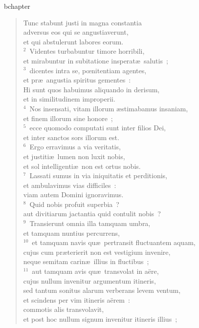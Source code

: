 bchapter\begin{flushleft}\begin{verse}\vspace{-19pt}Tunc stabunt justi in magna constantia\\ adversus eos qui se angustiaverunt,\\ et qui abstulerunt labores eorum.\\
${}^{2}$~Videntes turbabuntur timore horribili,\\ et mirabuntur in subitatione insperat\ae\ salutis~;\\
${}^{3}$~dicentes intra se, pœnitentiam agentes,\\ et pr\ae\ angustia spiritus gementes~:\\ Hi sunt quos habuimus aliquando in derisum,\\ et in similitudinem improperii.\\
${}^{4}$~Nos insensati, vitam illorum \ae stimabamus insaniam,\\ et finem illorum sine honore~;\\
${}^{5}$~ecce quomodo computati sunt inter filios Dei,\\ et inter sanctos sors illorum est.\\
${}^{6}$~Ergo erravimus a via veritatis,\\ et justiti\ae\ lumen non luxit nobis,\\ et sol intelligenti\ae\ non est ortus nobis.\\
${}^{7}$~Lassati sumus in via iniquitatis et perditionis,\\ et ambulavimus vias difficiles~:\\ viam autem Domini ignoravimus.\\
${}^{8}$~Quid nobis profuit superbia~?\\ aut divitiarum jactantia quid contulit nobis~?\\
${}^{9}$~Transierunt omnia illa tamquam umbra,\\ et tamquam nuntius percurrens,\\
${}^{10}$~et tamquam navis qu\ae\ pertransit fluctuantem aquam,\\ cujus cum pr\ae terierit non est vestigium invenire,\\ neque semitam carin\ae\ illius in fluctibus~;\\
${}^{11}$~aut tamquam avis qu\ae\ transvolat in a\"ere,\\ cujus nullum invenitur argumentum itineris,\\ sed tantum sonitus alarum verberans levem ventum,\\ et scindens per vim itineris a\"erem~:\\ commotis alis transvolavit,\\ et post hoc nullum signum invenitur itineris illius~;\\

\end{verse}
\end{flushleft}
